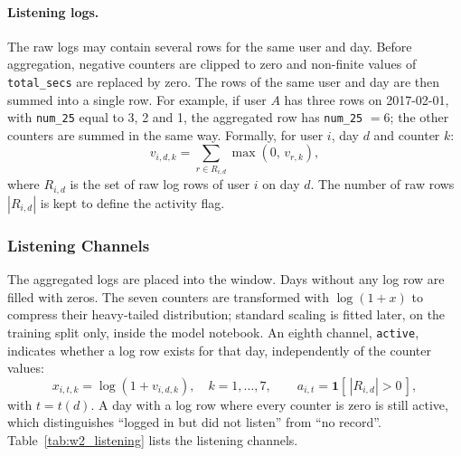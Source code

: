 \documentclass{article}
\newcommand{\ind}{\mathbf{1}}
\begin{document}
\paragraph{Listening logs.} The raw logs may contain several rows for the same user and day. Before aggregation, negative counters are clipped to zero and non-finite values of \texttt{total\_secs} are replaced by zero. The rows of the same user and day are then summed into a single row. For example, if user $A$ has three rows on 2017-02-01, with \texttt{num\_25} equal to 3, 2 and 1, the aggregated row has \texttt{num\_25} $= 6$; the other counters are summed in the same way. Formally, for user $i$, day $d$ and counter $k$:
\begin{equation}
v_{i,d,k} = \sum_{r \in R_{i,d}} \max(0,\, v_{r,k}),
\end{equation}
where $R_{i,d}$ is the set of raw log rows of user $i$ on day $d$. The number of raw rows $|R_{i,d}|$ is kept to define the activity flag.

\subsubsection{Listening Channels}

The aggregated logs are placed into the window. Days without any log row are filled with zeros. The seven counters are transformed with $\log(1+x)$ to compress their heavy-tailed distribution; standard scaling is fitted later, on the training split only, inside the model notebook. An eighth channel, \texttt{active}, indicates whether a log row exists for that day, independently of the counter values:
\begin{equation}
x_{i,t,k} = \log\!\left(1 + v_{i,d,k}\right), \quad k = 1,\dots,7, \qquad
a_{i,t} = \ind\!\left[\,|R_{i,d}| > 0\,\right],
\end{equation}
with $t = t(d)$. A day with a log row where every counter is zero is still active, which distinguishes ``logged in but did not listen'' from ``no record''. Table~\ref{tab:w2_listening} lists the listening channels.
\end{document}
